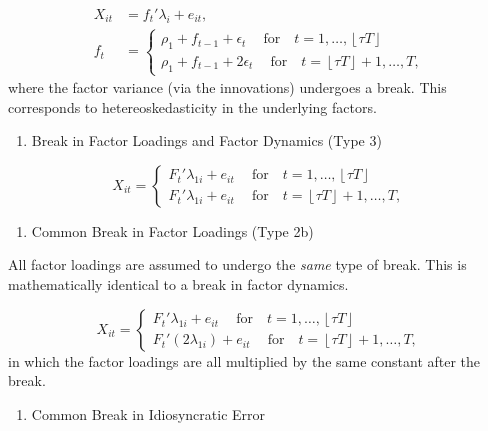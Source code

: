 \documentclass[
]{article}
\providecommand{\tightlist}{%
  \setlength{\itemsep}{0pt}\setlength{\parskip}{0pt}}
\begin{document}
\[
\begin{aligned}
X_{it} &= 
f_t' \lambda_{i} + e_{it}, \\
f_t &= \begin{cases}
\rho_1 + f_{t - 1} + \epsilon_{t}\ \quad \text{for} \quad t = 1, \dots, \left \lfloor \tau T \right \rfloor  \\
\rho_1 + f_{t - 1} + 2\epsilon_{t}\ \quad \text{for} \quad t = \left \lfloor \tau T \right \rfloor  + 1, \dots, T,
\end{cases}
\end{aligned}
\] where the factor variance (via the innovations) undergoes a break.
This corresponds to hetereoskedasticity in the underlying factors.

\begin{enumerate}
\def\labelenumi{\arabic{enumi}.}
\setcounter{enumi}{3}
\tightlist
\item
  Break in Factor Loadings and Factor Dynamics (Type 3)
\end{enumerate}

\[
X_{it} = \begin{cases}
F_{t}' \lambda_{1i} + e_{it}\ \quad \text{for} \quad t = 1, \dots, \left \lfloor \tau T \right \rfloor  \\
F_{t}' \lambda_{1i} + e_{it}\ \quad \text{for} \quad t = \left \lfloor \tau T \right \rfloor  + 1, \dots, T,
\end{cases}
\]

\begin{enumerate}
\def\labelenumi{\arabic{enumi}.}
\setcounter{enumi}{4}
\tightlist
\item
  Common Break in Factor Loadings (Type 2b)
\end{enumerate}

All factor loadings are assumed to undergo the \emph{same} type of
break. This is mathematically identical to a break in factor dynamics.

\[
X_{it} = \begin{cases}
F_{t}' \lambda_{1i} + e_{it}\ \quad \text{for} \quad t = 1, \dots, \left \lfloor \tau T \right \rfloor  \\
F_{t}' (2\lambda_{1i}) + e_{it}\ \quad \text{for} \quad t = \left \lfloor \tau T \right \rfloor  + 1, \dots, T,
\end{cases}
\] in which the factor loadings are all multiplied by the same constant
after the break.

\begin{enumerate}
\def\labelenumi{\arabic{enumi}.}
\setcounter{enumi}{5}
\tightlist
\item
  Common Break in Idiosyncratic Error
\end{enumerate}
\end{document}
